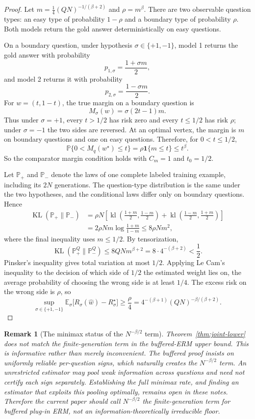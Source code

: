 \documentclass[11pt]{article}
\newtheorem{remark}{Remark}
\newcommand{\E}{\mathbb E}
\newcommand{\Pp}{\mathbb P}
\newcommand{\one}{\mathbf 1}
\newcommand{\wstar}{w^\star}
\begin{document}
\begin{proof}
Let $m=\frac14(QN)^{-1/(\beta+2)}$ and $\rho=m^\beta$.  There are two observable question types: an easy type of probability $1-\rho$ and a boundary type of probability $\rho$.  Both models return the gold answer deterministically on easy questions.

On a boundary question, under hypothesis $\sigma\in\{+1,-1\}$, model 1 returns the gold answer with probability
\[
p_{1,\sigma}=\frac{1+\sigma m}{2},
\]
and model 2 returns it with probability
\[
p_{2,\sigma}=\frac{1-\sigma m}{2}.
\]
For $w=(t,1-t)$, the true margin on a boundary question is
\[
M_{\sigma}(w)=\sigma(2t-1)m.
\]
Thus under $\sigma=+1$, every $t>1/2$ has risk zero and every $t\le1/2$ has risk $\rho$; under $\sigma=-1$ the two sides are reversed.  At an optimal vertex, the margin is $m$ on boundary questions and one on easy questions.  Therefore, for $0<t\le1/2$,
\[
\Pp\{0<M_q(\wstar)\le t\}
=
\rho\one\{m\le t\}
\le t^\beta.
\]
So the comparator margin condition holds with $C_m=1$ and $t_0=1/2$.

Let $\mathbb P_+$ and $\mathbb P_-$ denote the laws of one complete labeled training example, including its $2N$ generations.  The question-type distribution is the same under the two hypotheses, and the conditional laws differ only on boundary questions.  Hence
\begin{align*}
\operatorname{KL}(\mathbb P_+\|\mathbb P_-)
&=
\rho N
\left[
\operatorname{kl}\left(\frac{1+m}{2},\frac{1-m}{2}\right)
+
\operatorname{kl}\left(\frac{1-m}{2},\frac{1+m}{2}\right)
\right]\\
&=
2\rho N m\log\frac{1+m}{1-m}
\le
8\rho Nm^2,
\end{align*}
where the final inequality uses $m\le1/2$.  By tensorization,
\[
\operatorname{KL}(\mathbb P_+^Q\|\mathbb P_-^Q)
\le
8QN m^{\beta+2}
=
8\cdot4^{-(\beta+2)}
<\frac12.
\]
Pinsker's inequality gives total variation at most $1/2$.  Applying Le Cam's inequality to the decision of which side of $1/2$ the estimated weight lies on, the average probability of choosing the wrong side is at least $1/4$.  The excess risk on the wrong side is $\rho$, so
\[
\sup_{\sigma\in\{+1,-1\}}
\E_\sigma\big[R_\sigma(\widehat w)-R_\sigma^\star\big]
\ge
\frac\rho4
=
4^{-(\beta+1)}(QN)^{-\beta/(\beta+2)}.
\]
\end{proof}

\begin{remark}[The minimax status of the $N^{-\beta/2}$ term]
Theorem~\ref{thm:joint-lower} does not match the finite-generation term in the buffered-ERM upper bound.  This is informative rather than merely inconvenient.  The buffered proof insists on uniformly reliable per-question signs, which naturally creates the $N^{-\beta/2}$ term.  An unrestricted estimator may pool weak information across questions and need not certify each sign separately.  Establishing the full minimax rate, and finding an estimator that exploits this pooling optimally, remains open in these notes.  Therefore the current paper should call $N^{-\beta/2}$ the finite-generation term for buffered plug-in ERM, not an information-theoretically irreducible floor.
\end{remark}
\end{document}
